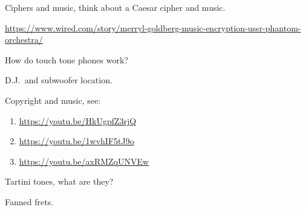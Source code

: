 \documentclass[12pt,noauthor,nooutcomes]{ximera}%
\begin{document}
\begin{project}
Ciphers and music, think about a Caesar cipher and music. 

\url{https://www.wired.com/story/merryl-goldberg-music-encryption-ussr-phantom-orchestra/}
\end{project}

\begin{project}
How do touch tone phones work?
\end{project}


\begin{project}
D.J.\ and subwoofer location. 
\end{project}




\begin{project}
Copyright and music, see:
\begin{enumerate}
\item \url{https://youtu.be/HkUgpfZ3rjQ}
\item \url{https://youtu.be/1wvhIF5tJ9o}
\item \url{https://youtu.be/axRMZqUNVEw}
\end{enumerate}
\end{project}


\begin{project}
Tartini tones, what are they? 
\end{project}


\begin{project}
Fanned frets.
\end{project}
\end{document}
